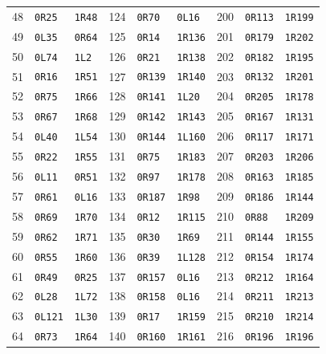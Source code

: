 {\begin{longtable}{@{}rll@{\hspace{8mm}}rll@{\hspace{8mm}}rll@{}}
48 & \texttt{0R25} & \texttt{1R48} & 124 & \texttt{0R70} & \texttt{0L16} & 200 & \texttt{0R113} & \texttt{1R199} \\
49 & \texttt{0L35} & \texttt{0R64} & 125 & \texttt{0R14} & \texttt{1R136} & 201 & \texttt{0R179} & \texttt{1R202} \\
50 & \texttt{0L74} & \texttt{1L2} & 126 & \texttt{0R21} & \texttt{1R138} & 202 & \texttt{0R182} & \texttt{1R195} \\
51 & \texttt{0R16} & \texttt{1R51} & 127 & \texttt{0R139} & \texttt{1R140} & 203 & \texttt{0R132} & \texttt{1R201} \\
52 & \texttt{0R75} & \texttt{1R66} & 128 & \texttt{0R141} & \texttt{1L20} & 204 & \texttt{0R205} & \texttt{1R178} \\
53 & \texttt{0R67} & \texttt{1R68} & 129 & \texttt{0R142} & \texttt{1R143} & 205 & \texttt{0R167} & \texttt{1R131} \\
54 & \texttt{0L40} & \texttt{1L54} & 130 & \texttt{0R144} & \texttt{1L160} & 206 & \texttt{0R117} & \texttt{1R171} \\
55 & \texttt{0R22} & \texttt{1R55} & 131 & \texttt{0R75} & \texttt{1R183} & 207 & \texttt{0R203} & \texttt{1R206} \\
56 & \texttt{0L11} & \texttt{0R51} & 132 & \texttt{0R97} & \texttt{1R178} & 208 & \texttt{0R163} & \texttt{1R185} \\
57 & \texttt{0R61} & \texttt{0L16} & 133 & \texttt{0R187} & \texttt{1R98} & 209 & \texttt{0R186} & \texttt{1R144} \\
58 & \texttt{0R69} & \texttt{1R70} & 134 & \texttt{0R12} & \texttt{1R115} & 210 & \texttt{0R88} & \texttt{1R209} \\
59 & \texttt{0R62} & \texttt{1R71} & 135 & \texttt{0R30} & \texttt{1R69} & 211 & \texttt{0R144} & \texttt{1R155} \\
60 & \texttt{0R55} & \texttt{1R60} & 136 & \texttt{0R39} & \texttt{1L128} & 212 & \texttt{0R154} & \texttt{1R174} \\
61 & \texttt{0R49} & \texttt{0R25} & 137 & \texttt{0R157} & \texttt{0L16} & 213 & \texttt{0R212} & \texttt{1R164} \\
62 & \texttt{0L28} & \texttt{1L72} & 138 & \texttt{0R158} & \texttt{0L16} & 214 & \texttt{0R211} & \texttt{1R213} \\
63 & \texttt{0L121} & \texttt{1L30} & 139 & \texttt{0R17} & \texttt{1R159} & 215 & \texttt{0R210} & \texttt{1R214} \\
64 & \texttt{0R73} & \texttt{1R64} & 140 & \texttt{0R160} & \texttt{1R161} & 216 & \texttt{0R196} & \texttt{1R196} \\

\end{longtable}}
